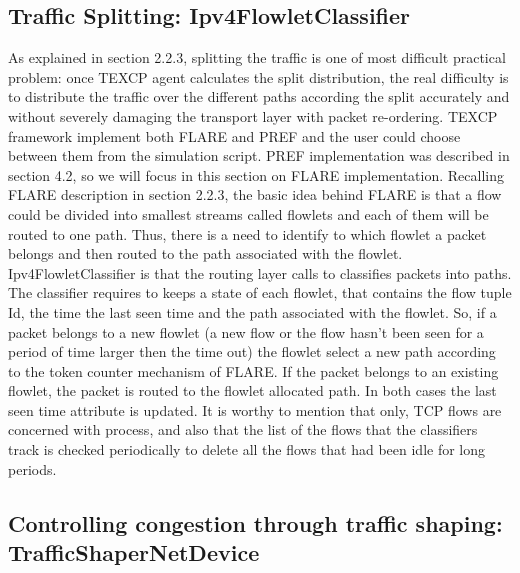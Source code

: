\subsection{Traffic Splitting: Ipv4FlowletClassifier}

As explained in section 2.2.3, splitting the traffic is one of most difficult practical problem: once TEXCP agent calculates the split distribution, the real difficulty is to distribute the traffic over the different paths according the split accurately and without  severely damaging the transport layer with packet re-ordering. TEXCP framework implement both FLARE and PREF and the user could choose between them from the simulation script. PREF implementation was described in section 4.2, so we will focus in this section on FLARE implementation. Recalling FLARE description in section 2.2.3, the basic idea behind FLARE is that a flow could be divided into smallest streams called flowlets and each of them will be routed to one path. Thus, there is a need to identify to which flowlet a packet belongs and then routed to the path associated with the flowlet. Ipv4FlowletClassifier is that the routing layer calls to classifies packets into paths. The classifier requires to keeps a state of each flowlet, that contains the flow tuple Id, the time the last seen time and the path associated with the flowlet. So, if a packet belongs to a new flowlet (a new flow or the flow hasn't been seen for a period of time larger then the time out) the flowlet select a new path according to the token counter mechanism of FLARE. If the packet belongs to an existing flowlet, the packet is routed to the flowlet allocated path. In both cases the last seen time attribute is updated. It is worthy to mention that only, TCP flows are concerned with process, and also that the list of the flows that the classifiers track is checked periodically to delete all the flows that had been idle for long periods. 

\subsection{Controlling congestion through traffic shaping: TrafficShaperNetDevice}

